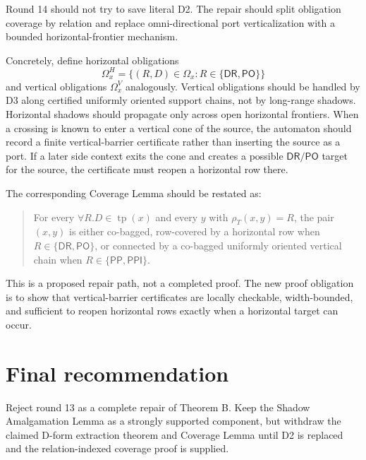\documentclass[11pt]{article}
\newcommand{\PP}{\mathsf{PP}}
\newcommand{\PPI}{\mathsf{PPI}}
\newcommand{\PO}{\mathsf{PO}}
\newcommand{\DR}{\mathsf{DR}}
\newcommand{\tp}{\operatorname{tp}}
\begin{document}
Round 14 should not try to save literal D2.  The repair should split obligation
coverage by relation and replace omni-directional port verticalization with a
bounded horizontal-frontier mechanism.

Concretely, define horizontal obligations
\[
  \Omega_x^H=\{(R,D)\in\Omega_x:R\in\{\DR,\PO\}\}
\]
and vertical obligations $\Omega_x^V$ analogously.  Vertical obligations should
be handled by D3 along certified uniformly oriented support chains, not by
long-range shadows.  Horizontal shadows should propagate only across open
horizontal frontiers.  When a crossing is known to enter a vertical cone of the
source, the automaton should record a finite vertical-barrier certificate rather
than inserting the source as a port.  If a later side context exits the cone and
creates a possible $\DR/\PO$ target for the source, the certificate must reopen
a horizontal row there.

The corresponding Coverage Lemma should be restated as:
\begin{quote}
For every $\forall R.D\in\tp(x)$ and every $y$ with $\rho_T(x,y)=R$, the pair
$(x,y)$ is either co-bagged, row-covered by a horizontal row when
$R\in\{\DR,\PO\}$, or connected by a co-bagged uniformly oriented vertical chain
when $R\in\{\PP,\PPI\}$.
\end{quote}
This is a proposed repair path, not a completed proof.  The new proof
obligation is to show that vertical-barrier certificates are locally checkable,
width-bounded, and sufficient to reopen horizontal rows exactly when a
horizontal target can occur.

\section{Final recommendation}

Reject round 13 as a complete repair of Theorem B.  Keep the Shadow
Amalgamation Lemma as a strongly supported component, but withdraw the claimed
D-form extraction theorem and Coverage Lemma until D2 is replaced and the
relation-indexed coverage proof is supplied.
\end{document}
